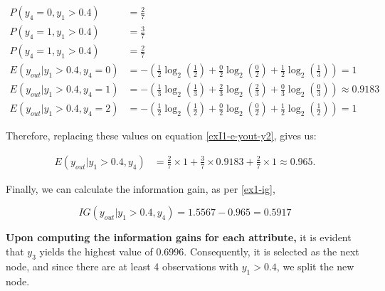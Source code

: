 \documentclass[12pt]{article}
\begin{document}
\begin{enumerate}[leftmargin=\labelsep]
        \[
          \begin{aligned}
            P(y_4 = 0, y_1 > 0.4)            & = \frac{2}{7}                                                                                     \\
            P(y_4 = 1, y_1 > 0.4)            & = \frac{3}{7}                                                                                     \\
            P(y_4 = 1, y_1 > 0.4)            & = \frac{2}{7}                                                                                     \\
            E(y_{out} | y_1 > 0.4 , y_4 = 0) & = - \left(\frac{1}{2} \log_2\left(\frac{1}{2}\right) + \frac{0}{2} \log_2\left(\frac{0}{2}\right)
            + \frac{1}{2} \log_2\left(\frac{1}{3}\right)\right) = 1                                                                              \\
            E(y_{out} | y_1 > 0.4 , y_4 = 1) & = - \left(\frac{1}{3} \log_2\left(\frac{1}{3}\right) + \frac{2}{3} \log_2\left(\frac{2}{3}\right)
            + \frac{0}{3} \log_2\left(\frac{0}{3}\right)\right) \approx 0.9183                                                                   \\
            E(y_{out} | y_1 > 0.4 , y_4 = 2) & = - \left(\frac{1}{2} \log_2\left(\frac{1}{2}\right) + \frac{0}{2} \log_2\left(\frac{0}{2}\right)
            + \frac{1}{2} \log_2\left(\frac{1}{2}\right)\right) = 1
          \end{aligned}
        \]

        Therefore, replacing these values on equation \eqref{exI1-e-yout-y2}, gives us:

        \[
          \begin{aligned}
            E(y_{out} | y_1>0.4, y_4) & = \frac{2}{7} \times 1 + \frac{3}{7} \times 0.9183 +  \frac{2}{7} \times 1 \approx 0.965.
          \end{aligned}
        \]

        Finally, we can calculate the information gain, as per \eqref{ex1-ig},

        \[
          IG(y_{out} | y_1 > 0.4, y_{4}) = 1.5567 - 0.965 = 0.5917
        \]

        \textbf{Upon computing the information gains for each attribute,} it is evident that $y_3$ yields the highest value of 0.6996. Consequently,
        it is selected as the next node, and since there are at least 4 observations with $y_1 > 0.4$, we split the new node.


\end{enumerate}
\end{document}
